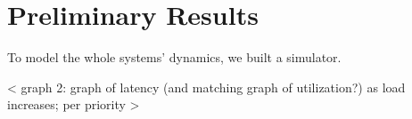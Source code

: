 \section{Preliminary Results}



To model the whole systems' dynamics, we built a simulator.

< graph 2: graph of latency (and matching graph of utilization?) as load increases; per priority >

